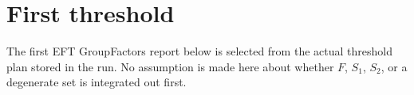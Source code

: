 \documentclass[9pt]{article}
\begin{document}
\section*{First threshold}
The first EFT GroupFactors report below is selected from the actual threshold plan stored in the run.  No assumption is made here about whether $F$, $S_1$, $S_2$, or a degenerate set is integrated out first.
\end{document}
